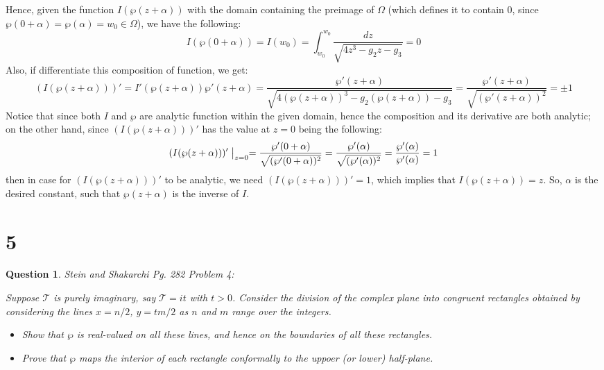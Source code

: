 \documentclass{article}
\newtheorem{question}{Question}
\begin{document}
Hence, given the function $I(\wp(z+\alpha))$ with the domain containing the preimage of $\Omega$ (which defines it to contain $0$, since $\wp(0+\alpha)=\wp(\alpha)=w_0\in\Omega$), we have the following:
$$I(\wp(0+\alpha)) = I(w_0)=\int_{w_0}^{w_0}\frac{dz}{\sqrt{4z^3-g_2z-g_3}} = 0$$
Also, if differentiate this composition of function, we get:
$$(I(\wp(z+\alpha)))' = I'(\wp(z+\alpha))\wp'(z+\alpha) = \frac{\wp'(z+\alpha)}{\sqrt{4(\wp(z+\alpha))^3-g_2(\wp(z+\alpha))-g_3}} = \frac{\wp'(z+\alpha)}{\sqrt{(\wp'(z+\alpha))^2}} = \pm 1$$
Notice that since both $I$ and $\wp$ are analytic function within the given domain, hence the composition and its derivative are both analytic;
on the other hand, since $(I(\wp(z+\alpha)))'$ has the value at $z=0$ being the following:
$$(I(\wp(z+\alpha)))'\bigm|_{z=0} = \frac{\wp'(0+\alpha)}{\sqrt{(\wp'(0+\alpha))^2}} = \frac{\wp'(\alpha)}{\sqrt{(\wp'(\alpha))^2}} = \frac{\wp'(\alpha)}{\wp'(\alpha)}=1$$
then in case for $(I(\wp(z+\alpha)))'$ to be analytic, we need $(I(\wp(z+\alpha)))' = 1$, which implies that $I(\wp(z+\alpha))=z$.
So, $\alpha$ is the desired constant, such that $\wp(z+\alpha)$ is the inverse of $I$.

\break

\section*{5}
\begin{myBox}[]{}
    \begin{question}
        Stein and Shakarchi Pg. 282 Problem 4:

        Suppose $\mathcal{T}$ is purely imaginary, say $\mathcal{T}=it$ with $t>0$. 
        Consider the division of the complex plane into congruent rectangles obtained by considering the lines $x=n/2$, $y=tm/2$ as $n$ and $m$ range over the integers.
        \begin{itemize}
            \item[(a)] Show that $\wp$ is real-valued on all these lines, and hence on the boundaries of all these rectangles.
            \item[(b)] Prove that $\wp$ maps the interior of each rectangle conformally to the uppoer (or lower) half-plane. 
        \end{itemize}
    \end{question}
\end{myBox}
\end{document}
